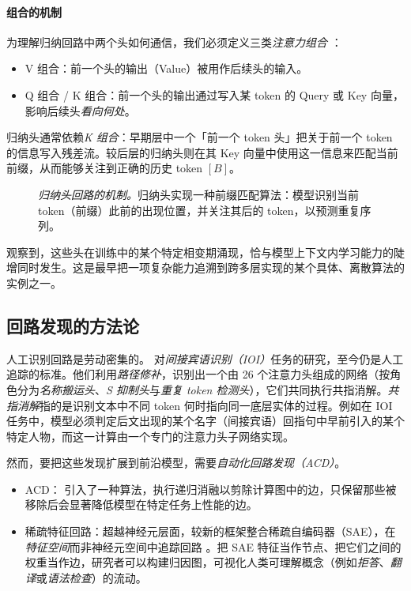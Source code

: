 \paragraph{组合的机制}
为理解归纳回路中两个头如何通信，我们必须定义三类\emph{注意力组合} \citep{elhage2021mathematical}：
\begin{itemize}
    \item V 组合：前一个头的输出（Value）被用作后续头的输入。
    \item Q 组合 / K 组合：前一个头的输出通过写入某 token 的 Query 或 Key 向量，影响后续头\emph{看向何处}。
\end{itemize}
归纳头通常依赖\emph{K 组合}：早期层中一个「前一个 token 头」把关于前一个 token 的信息写入残差流。较后层的归纳头则在其 Key 向量中使用这一信息来匹配当前前缀，从而能够关注到正确的历史 token $[B]$。
\begin{figure}[htbp]
    \centering
    \resizebox{1.0\textwidth}{!}{
        
    }
    \caption{\emph{归纳头回路的机制。}归纳头实现一种前缀匹配算法：模型识别当前 token（前缀）此前的出现位置，并关注其后的 token，以预测重复序列。
    \label{fig:induction_head} }
\end{figure}

\citet{olsson2022context} 观察到，这些头在训练中的某个特定相变期涌现，恰与模型上下文内学习能力的陡增同时发生。这是最早把一项复杂能力追溯到跨多层实现的某个具体、离散算法的实例之一。

\subsection{回路发现的方法论}
人工识别回路是劳动密集的。\citet{wang2022interpretability} 对\emph{间接宾语识别（IOI）}任务的研究，至今仍是人工追踪的标准。他们利用\emph{路径修补}，识别出一个由 26 个注意力头组成的网络（按角色分为{\em 名称搬运头}、{\em S 抑制头}与{\em 重复 token 检测头}），它们共同执行共指消解。\emph{共指消解}指的是识别文本中不同 token 何时指向同一底层实体的过程。例如在 IOI 任务中，模型必须判定后文出现的某个名字（间接宾语）回指句中早前引入的某个特定人物，而这一计算由一个专门的注意力头子网络实现。

然而，要把这些发现扩展到前沿模型，需要\emph{自动化回路发现（ACD）}。
\begin{itemize}
    \item ACD：\citet{conmy2023towards} 引入了一种算法，执行递归消融以剪除计算图中的边，只保留那些被移除后会显著降低模型在特定任务上性能的边。
    \item 稀疏特征回路：超越神经元层面，较新的框架整合稀疏自编码器（SAE），在\emph{特征空间}而非神经元空间中追踪回路 \citep{marks2024sparse}。把 SAE 特征当作节点、把它们之间的权重当作边，研究者可以构建归因图，可视化人类可理解概念（例如\emph{拒答}、\emph{翻译}或\emph{语法检查}）的流动。
\end{itemize}



